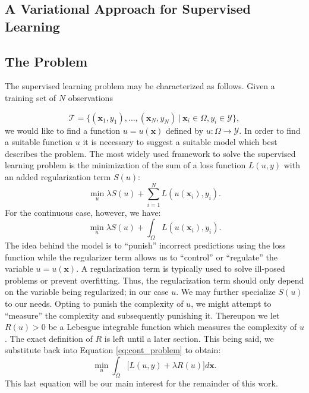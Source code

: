 \documentclass{INGUADY}
\begin{document}
\begin{body}
\section{A Variational Approach for Supervised Learning}
\subsection{The Problem}
The supervised learning problem may be characterized as follows. Given a training set of $N$ observations

\begin{equation*}
\mathcal{T} = \{  (\mathbf{x}_1, y_1), \ldots, (\mathbf{x}_N, y_N) \  | \  \mathbf{x}_i \in \Omega, y_i \in  \mathcal{Y}\} ,
\end{equation*}
we would like to find a function $u = u(\mathbf{x})$ defined by $u: \Omega \rightarrow \mathcal{Y}$. In order to find a suitable function $u$ it is necessary to suggest a suitable model which best describes the problem. The most widely used framework to solve the supervised learning problem is the minimization of the sum of a loss function $L(u, y)$ with an added regularization term $S(u)$:
\begin{equation*}
\min_u \lambda S(u) + \sum^N_{i=1} L(u(\mathbf{x}_i), y_i) .
\end{equation*}
For the continuous case, however, we have:
\begin{equation} \label{eq:cont_problem}
\min_u \lambda S(u) + \int_\Omega L(u(\mathbf{x}_i), y_i) .
\end{equation}
The idea behind the model is to ``punish'' incorrect predictions using the loss function while the regularizer term allows us to ``control'' or ``regulate'' the variable $u = u(\mathbf{x})$. A regularization term is typically used to solve ill-posed problems or prevent overfitting. Thus, the regularization term should only depend on the variable being regularized; in our case $u$. We may further specialize $S(u)$ to our needs. Opting to punish the complexity of $u$, we might attempt to  ``measure'' the complexity and subsequently punishing it. Thereupon we let $R(u) > 0$ be a Lebesgue integrable function which measures the complexity of $u$. The exact definition of $R$ is left until a later section. This being said, we substitute back into Equation \ref{eq:cont_problem} to obtain:
\begin{equation} \label{eq:our_model}
\min_u \int_\Omega \Big[  L(u, y) + \lambda R(u)  \Big] d\mathbf{x} .
\end{equation}
This last equation will be our main interest for the remainder of this work.


\end{body}
\end{document}
